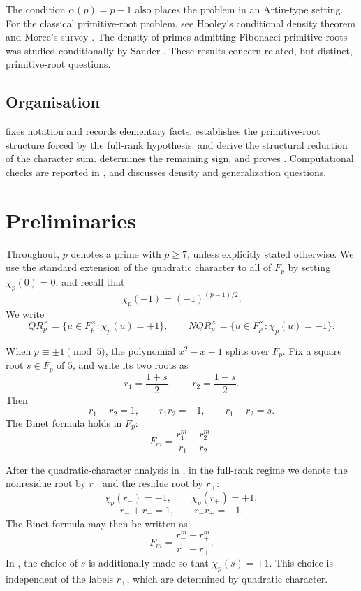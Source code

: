 \documentclass[preprint,12pt]{elsarticle}
\def\F{F}%
\def\QR{QR}%
\def\NQR{NQR}%
\numberwithin{equation}{section}
\theoremstyle{plain}
\theoremstyle{definition}
\newcommand{\F}{\mathbb{F}}
\newcommand{\QR}{\mathrm{QR}}
\newcommand{\NQR}{\mathrm{NQR}}
\begin{document}
The condition $\alpha(p)=p-1$ also places the problem in an
Artin-type setting. For the classical primitive-root problem, see
Hooley's conditional density theorem \cite{Hooley1967} and Moree's
survey \cite{Moree2012}. The density of primes admitting Fibonacci
primitive roots was studied conditionally by Sander
\cite{Sander1990}. These results concern related, but distinct,
primitive-root questions.
 
\subsection{Organisation}
 
 fixes notation and records elementary
facts.  establishes the primitive-root structure
forced by the full-rank hypothesis.  and
 derive the structural reduction of the
character sum.  determines the remaining sign, and
 proves . Computational checks
are reported in , and
 discusses density and generalization questions.
 
\section{Preliminaries}\label{sec:preliminaries}
 
Throughout, $p$ denotes a prime with $p\ge7$, unless explicitly
stated otherwise. We use the standard
extension of the quadratic character to all of $\F_p$ by setting
$\chi_p(0)=0$, and recall that
\[
\chi_p(-1)=(-1)^{(p-1)/2}.
\]
We write
\[
\QR_p^\times
=
\{u\in\F_p^\times:\chi_p(u)=+1\},
\qquad
\NQR_p^\times
=
\{u\in\F_p^\times:\chi_p(u)=-1\}.
\]
 
When $p\equiv\pm1\pmod5$, the polynomial $x^2-x-1$ splits over
$\F_p$. Fix a square root $s\in\F_p$ of $5$, and write its two roots
as
\[
r_1=\frac{1+s}{2},
\qquad
r_2=\frac{1-s}{2}.
\]
Then
\[
r_1+r_2=1,
\qquad
r_1r_2=-1,
\qquad
r_1-r_2=s.
\]
The Binet formula holds in $\F_p$:
\begin{equation}\label{eq:binet}
F_m=\frac{r_1^m-r_2^m}{r_1-r_2}.
\end{equation}
 
After the quadratic-character analysis in
, in the full-rank regime we denote
the nonresidue root by $r_-$ and the residue root by $r_+$:
\[
\chi_p(r_-)=-1,
\qquad
\chi_p(r_+)=+1,
\]
\[
r_-+r_+=1,
\qquad
r_-r_+=-1.
\]
The Binet formula may then be written as
\[
F_m=\frac{r_-^m-r_+^m}{r_--r_+}.
\]
In , the choice of $s$ is additionally made so that
$\chi_p(s)=+1$. This choice is independent of the labels $r_\pm$,
which are determined by quadratic character.
 
\end{document}
